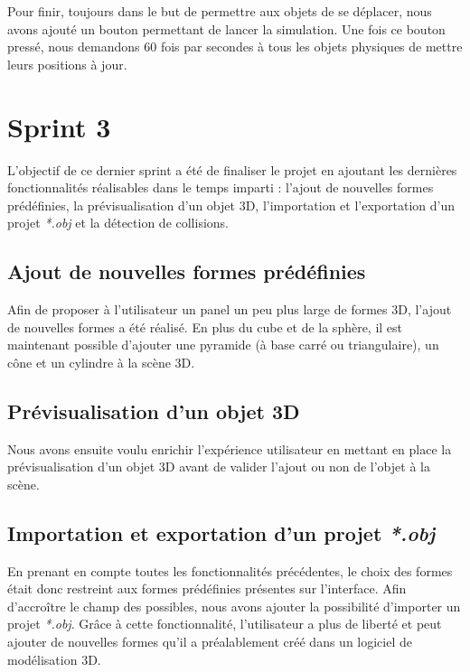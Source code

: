 \documentclass[11pt]{report}
\begin{document}
Pour finir, toujours dans le but de permettre aux objets de se déplacer, nous avons ajouté un bouton permettant de lancer la simulation.
Une fois ce bouton pressé, nous demandons 60 fois par secondes à tous les objets physiques de mettre leurs positions à jour.


\section{Sprint 3}

L'objectif de ce dernier sprint a été de finaliser le projet en ajoutant les dernières fonctionnalités réalisables dans le temps imparti : l'ajout de nouvelles formes prédéfinies, la prévisualisation d'un objet 3D, l'importation et l'exportation d'un projet \textit{*.obj} et la détection de collisions. 
\newpage
\subsection{Ajout de nouvelles formes prédéfinies}
Afin de proposer à l'utilisateur un panel un peu plus large de formes 3D, l'ajout de nouvelles formes a été réalisé.
En plus du cube et de la sphère, il est maintenant possible d'ajouter une pyramide (à base carré ou triangulaire), un cône et un cylindre à la scène 3D.


\subsection{Prévisualisation d'un objet 3D}
Nous avons ensuite voulu enrichir l'expérience utilisateur en mettant en place la prévisualisation d'un objet 3D avant de valider l'ajout ou non de l'objet à la scène.


\subsection{Importation et exportation d'un projet \textit{*.obj}}
En prenant en compte toutes les fonctionnalités précédentes, le choix des formes était donc restreint aux formes prédéfinies présentes sur l'interface. Afin d'accroître le champ des possibles, nous avons ajouter la possibilité d'importer un projet \textit{*.obj}. Grâce à cette fonctionnalité, l'utilisateur a plus de liberté et peut ajouter de nouvelles formes qu'il a préalablement créé dans un logiciel de modélisation 3D.\newline
\end{document}
